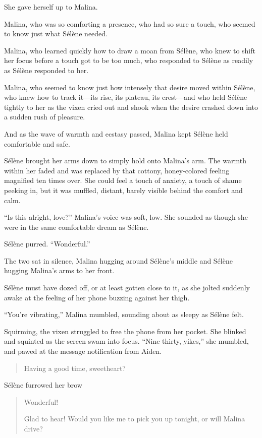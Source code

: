 She gave herself up to Malina.

Malina, who was so comforting a presence, who had so sure a touch, who seemed to know just what Sélène needed.

Malina, who learned quickly how to draw a moan from Sélène, who knew to shift her focus before a touch got to be too much, who responded to Sélène as readily as Sélène responded to her.

Malina, who seemed to know just how intensely that desire moved within Sélène, who knew how to track it---its rise, its plateau, its crest---and who held Sélène tightly to her as the vixen cried out and shook when the desire crashed down into a sudden rush of pleasure.

And as the wave of warmth and ecstasy passed, Malina kept Sélène held comfortable and safe.

Sélène brought her arms down to simply hold onto Malina's arm. The warmth within her faded and was replaced by that cottony, honey-colored feeling magnified ten times over. She could feel a touch of anxiety, a touch of shame peeking in, but it was muffled, distant, barely visible behind the comfort and calm.

``Is this alright, love?'' Malina's voice was soft, low. She sounded as though she were in the same comfortable dream as Sélène.

Sélène purred. ``Wonderful.''

The two sat in silence, Malina hugging around Sélène's middle and Sélène hugging Malina's arms to her front.

\secdiv{}

\noindent Sélène must have dozed off, or at least gotten close to it, as she jolted suddenly awake at the feeling of her phone buzzing against her thigh.

``You're vibrating,'' Malina mumbled, sounding about as sleepy as Sélène felt.

Squirming, the vixen struggled to free the phone from her pocket. She blinked and squinted as the screen swam into focus. ``Nine thirty, yikes,'' she mumbled, and pawed at the message notification from Aiden.

\begin{quote}
 Having a good time, sweetheart?
\end{quote}

Sélène furrowed her brow

\begin{quote}
 Wonderful!

 Glad to hear! Would you like me to pick you up tonight, or will Malina drive?
\end{quote}

